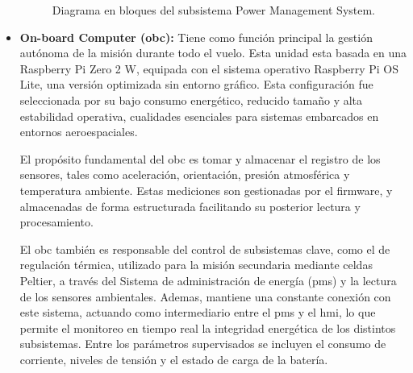 \begin{itemize}
\begin{figure}[H]
            \caption{Diagrama en bloques del subsistema Power Management System.}
        \label{fig:sistema_pms}
      \end{figure}

      \item \textbf{On-board Computer (\acrshort{obc}):} Tiene como función principal la gestión autónoma de
        la misión durante todo el vuelo. Esta unidad esta basada en una Raspberry Pi Zero 2
        W, equipada con el sistema operativo Raspberry Pi OS Lite, una versión optimizada sin
        entorno gráfico. Esta configuración fue seleccionada por su bajo consumo energético,
        reducido tamaño y alta estabilidad operativa, cualidades esenciales para sistemas embarcados
        en entornos aeroespaciales.

        El propósito fundamental del \acrshort{obc} es tomar y almacenar el registro de los sensores,
        tales como aceleración, orientación, presión atmosférica y temperatura ambiente. Estas
        mediciones son gestionadas por el firmware, y almacenadas de forma estructurada
        facilitando su posterior lectura y procesamiento.

        El \acrshort{obc} también es responsable del control de subsistemas clave, como el de regulación
        térmica, utilizado para la misión secundaria mediante celdas Peltier, a través del Sistema de
        administración de energía (\acrshort{pms}) y la lectura de los sensores ambientales. Ademas, mantiene una
        constante conexión con este sistema, actuando como intermediario entre el \acrshort{pms} y el \acrshort{hmi}, lo
        que permite el monitoreo en tiempo real la integridad energética de los distintos subsistemas.
        Entre los parámetros supervisados se incluyen el consumo de corriente, niveles de tensión y el
        estado de carga de la batería.


\end{itemize}
